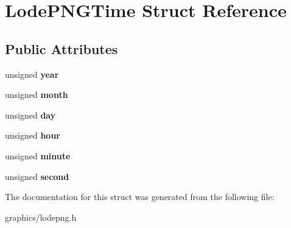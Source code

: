 \hypertarget{struct_lode_p_n_g_time}{\section{Lode\+P\+N\+G\+Time Struct Reference}
\label{struct_lode_p_n_g_time}
}
\subsection*{Public Attributes}
\begin{DoxyCompactItemize}
\item 
\hypertarget{struct_lode_p_n_g_time_a32b68342f39f3d38ba91a721b1149b8f}{unsigned {\bfseries year}}\label{struct_lode_p_n_g_time_a32b68342f39f3d38ba91a721b1149b8f}

\item 
\hypertarget{struct_lode_p_n_g_time_a295d890e862d5cd0c444e9d3a96fa9d5}{unsigned {\bfseries month}}\label{struct_lode_p_n_g_time_a295d890e862d5cd0c444e9d3a96fa9d5}

\item 
\hypertarget{struct_lode_p_n_g_time_aa3dee3b7b3a1e730fbded7a7b8cf355e}{unsigned {\bfseries day}}\label{struct_lode_p_n_g_time_aa3dee3b7b3a1e730fbded7a7b8cf355e}

\item 
\hypertarget{struct_lode_p_n_g_time_ac99cb7f3ce16a85f9f505b7f5f6e0aa7}{unsigned {\bfseries hour}}\label{struct_lode_p_n_g_time_ac99cb7f3ce16a85f9f505b7f5f6e0aa7}

\item 
\hypertarget{struct_lode_p_n_g_time_ac3045de79728f29fc61f534b062e0f13}{unsigned {\bfseries minute}}\label{struct_lode_p_n_g_time_ac3045de79728f29fc61f534b062e0f13}

\item 
\hypertarget{struct_lode_p_n_g_time_a6c691c5821e828488a8bb8a90751a2f0}{unsigned {\bfseries second}}\label{struct_lode_p_n_g_time_a6c691c5821e828488a8bb8a90751a2f0}

\end{DoxyCompactItemize}


The documentation for this struct was generated from the following file\+:\begin{DoxyCompactItemize}
\item 
graphics/lodepng.\+h\end{DoxyCompactItemize}
